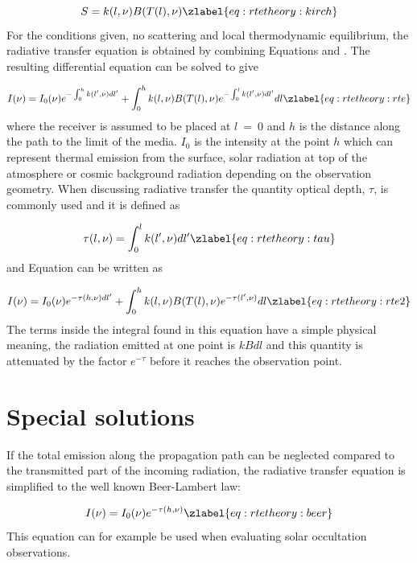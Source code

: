  \begin{equation}
   S = k(l,\nu)B(T(l),\nu)
  \zlabel{eq:rtetheory:kirch}
 \end{equation}  
 For the conditions given, no scattering and local thermodynamic
 equilibrium, the radiative transfer equation is obtained by combining
 Equations  and . The resulting
 differential equation can be solved to give

 \begin{equation}
   I(\nu) = I_0(\nu)e^{-\int^h_0{k(l',\nu)dl'}} + 
     \int^h_0{k(l,\nu)B(T(l),\nu) e^{-\int^l_0{k(l',\nu)dl'}} dl}
  \zlabel{eq:rtetheory:rte}
 \end{equation}  
 where the receiver is assumed to be placed at $l$~=~0 and $h$ is the
 distance along the path to the limit of the media. $I_0$ is the
 intensity at the point $h$ which can represent thermal emission from
 the surface, solar radiation at top of the atmosphere or cosmic
 background radiation depending on the observation geometry. When
 discussing radiative transfer the quantity optical depth, $\tau$, is
 commonly used and it is defined as

 \begin{equation}
   \tau(l,\nu) = \int^l_0{k(l',\nu)dl'} 
  \zlabel{eq:rtetheory:tau}
 \end{equation}  
 and Equation  can be written as
 
 \begin{equation}
   I(\nu) = I_0(\nu)e^{-\tau(h,\nu)dl'} + 
     \int^h_0{k(l,\nu)B(T(l),\nu) e^{-\tau(l',\nu)} dl}
  \zlabel{eq:rtetheory:rte2}
 \end{equation}  
 The terms inside the integral found in this equation have a simple
 physical meaning, the radiation emitted at one point is $kBdl$ and this
 quantity is attenuated by the factor $e^{-\tau}$ before it reaches the
 observation point.


\section{Special solutions}
 
 If the total emission along the propagation path can be neglected
 compared to the transmitted part of the incoming radiation, the
 radiative transfer equation is simplified to the well known Beer-Lambert law:
 
 \begin{equation}
   I(\nu) = I_0(\nu)e^{-\tau(h,\nu)}
  \zlabel{eq:rtetheory:beer}
 \end{equation}  
 This equation can for example be used when evaluating solar
 occultation observations.  
 
